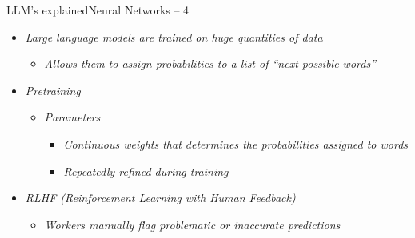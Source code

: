 \documentclass{beamer}
\begin{document}
\begin{frame}{LLM’s explained}{Neural Networks – 4}
\begin{itemize}
    \item \textit{Large language models are trained on huge quantities of data}
    \begin{itemize}
        \item \textit{Allows them to assign probabilities to a list of “next possible words”}
    \end{itemize}

    \item \textit{Pretraining}
    \begin{itemize}
        \item \textit{Parameters}
        \begin{itemize}
            \item \textit{Continuous weights that determines the probabilities assigned to words}
            \item \textit{Repeatedly refined during training}
        \end{itemize}
    \end{itemize}

    \item \textit{RLHF (Reinforcement Learning with Human Feedback)}
    \begin{itemize}
        \item \textit{Workers manually flag problematic or inaccurate predictions}
    \end{itemize}
\end{itemize}
\end{frame}
\end{document}
